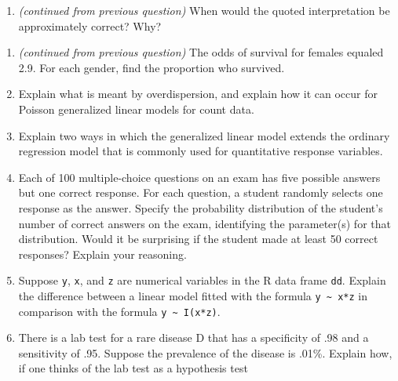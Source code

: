 \documentclass[
]{article}
\providecommand{\tightlist}{%
  \setlength{\itemsep}{0pt}\setlength{\parskip}{0pt}}
\begin{document}
\vspace{0px}

\begin{enumerate}
\def\labelenumi{\arabic{enumi}.}
\setcounter{enumi}{5}
\tightlist
\item
  \emph{(continued from previous question)} When would the quoted
  interpretation be approximately correct? Why?
\end{enumerate}

\vspace{0px}

\begin{enumerate}
\def\labelenumi{\arabic{enumi}.}
\setcounter{enumi}{6}
\item
  \emph{(continued from previous question)} The odds of survival for
  females equaled 2.9. For each gender, find the proportion who
  survived. \vspace{0px}
\item
  Explain what is meant by overdispersion, and explain how it can occur
  for Poisson generalized linear models for count data. \vspace{0px}
\item
  Explain two ways in which the generalized linear model extends the
  ordinary regression model that is commonly used for quantitative
  response variables. \vspace{0px}
\item
  Each of 100 multiple-choice questions on an exam has five possible
  answers but one correct response. For each question, a student
  randomly selects one response as the answer. Specify the probability
  distribution of the student's number of correct answers on the exam,
  identifying the parameter(s) for that distribution. Would it be
  surprising if the student made at least 50 correct responses? Explain
  your reasoning. \vspace{0px}
\item
  Suppose \texttt{y}, \texttt{x}, and \texttt{z} are numerical variables
  in the R data frame \texttt{dd}. \newline Explain the difference
  between a linear model fitted with the formula
  \texttt{y\ \textasciitilde{}\ x*z} in comparison with the formula
  \texttt{y\ \textasciitilde{}\ I(x*z)}. \vspace{0px}
\item
  There is a lab test for a rare disease D that has a specificity of .98
  and a sensitivity of .95. Suppose the prevalence of the disease is
  .01\%. Explain how, if one thinks of the lab test as a hypothesis test

\end{enumerate}
\end{document}
